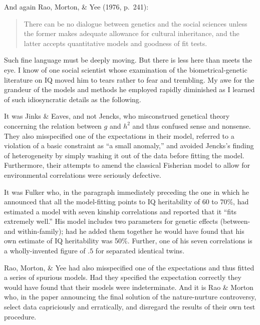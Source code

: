 ﻿\documentclass[12pt]{article}
\begin{document}
And again Rao, Morton, \& Yee (1976, p.\ 241):

\begin{quote}
There can be no dialogue between genetics and the social sciences unless the former makes adequate allowance for cultural inheritance, and the latter accepts quantitative models and goodness of fit tests.
\end{quote}

Such fine language must be deeply moving. But there is less here than meets the eye. I know of one social scientist whose examination of the biometrical-genetic literature on IQ moved him to tears rather to fear and trembling. My awe for the grandeur of the models and methods he employed rapidly diminished as I learned of such idiosyncratic details as the following.

It was Jinks \& Eaves, and not Jencks, who misconstrued genetical theory concerning the relation between $g$ and $h^2$ and thus confused sense and nonsense. They also misspecified one of the expectations in their model, referred to a violation of a basic constraint as ``a small anomaly,'' and avoided Jencks's finding of heterogeneity by simply washing it out of the data before fitting the model. Furthermore, their attempts to amend the classical Fisherian model to allow for environmental correlations were seriously defective.

It was Fulker who, in the paragraph immediately preceding the one in which he announced that all the model-fitting points to IQ heritability of 60 to 70\%, had estimated a model with seven kinship correlations and reported that it ``fits extremely well.'' His model includes two parameters for genetic effects (between- and within-family); had he added them together he would have found that his own estimate of IQ heritability was 50\%. Further, one of his seven correlations is a wholly-invented figure of $.5$
for separated identical twins.

Rao, Morton, \& Yee had also misspecified one of the expectations and thus fitted a series of spurious models. Had they specified the expectation correctly they would have found that their models were indeterminate. And it is Rao \& Morton who, in the paper announcing the final solution of the nature-nurture controversy, select data capriciously and erratically, and disregard the results of their own test procedure.
\end{document}
